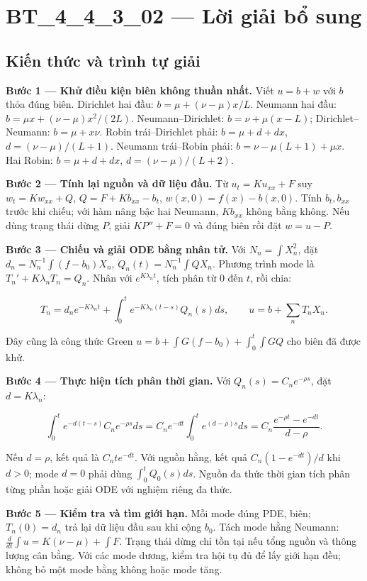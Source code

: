\documentclass[10pt,a4paper]{article}
\begin{document}
\section*{BT\_4\_4\_3\_02 — Lời giải bổ sung}
\subsection*{Kiến thức và trình tự giải}
\textbf{Bước 1 — Khử điều kiện biên không thuần nhất.} Viết $u=b+w$ với $b$ thỏa đúng biên. Dirichlet hai đầu: $b=\mu+(\nu-\mu)x/L$. Neumann hai đầu: $b=\mu x+(\nu-\mu)x^2/(2L)$. Neumann–Dirichlet: $b=\nu+\mu(x-L)$; Dirichlet–Neumann: $b=\mu+x\nu$. Robin trái–Dirichlet phải: $b=\mu+d+dx$, $d=(\nu-\mu)/(L+1)$. Neumann trái–Robin phải: $b=\nu-\mu(L+1)+\mu x$. Hai Robin: $b=\mu+d+dx$, $d=(\nu-\mu)/(L+2)$.

\textbf{Bước 2 — Tính lại nguồn và dữ liệu đầu.} Từ $u_t=Ku_{xx}+F$ suy $w_t=Kw_{xx}+Q$, $Q=F+Kb_{xx}-b_t$, $w(x,0)=f(x)-b(x,0)$. Tính $b_t,b_{xx}$ trước khi chiếu; với hàm nâng bậc hai Neumann, $Kb_{xx}$ không bằng không. Nếu dùng trạng thái dừng $P$, giải $KP''+F=0$ và đúng biên rồi đặt $w=u-P$.

\textbf{Bước 3 — Chiếu và giải ODE bằng nhân tử.} Với $N_n=\int X_n^2$, đặt $d_n=N_n^{-1}\int(f-b_0)X_n$, $Q_n(t)=N_n^{-1}\int QX_n$. Phương trình mode là $T_n'+K\lambda_nT_n=Q_n$. Nhân với $e^{K\lambda_nt}$, tích phân từ $0$ đến $t$, rồi chia:


\[
T_n=d_ne^{-K\lambda_nt}+\int_0^te^{-K\lambda_n(t-s)}Q_n(s)ds,\qquad
u=b+\sum_nT_nX_n.
\]


Đây cũng là công thức Green $u=b+\int G(f-b_0)+\int_0^t\int GQ$ cho biên đã được khử.

\textbf{Bước 4 — Thực hiện tích phân thời gian.} Với $Q_n(s)=C_ne^{-\rho s}$, đặt $d=K\lambda_n$:


\[
\int_0^te^{-d(t-s)}C_ne^{-\rho s}ds
=C_ne^{-dt}\int_0^te^{(d-\rho)s}ds
=C_n\frac{e^{-\rho t}-e^{-dt}}{d-\rho}.
\]


Nếu $d=\rho$, kết quả là $C_nte^{-dt}$. Với nguồn hằng, kết quả $C_n(1-e^{-dt})/d$ khi $d>0$; mode $d=0$ phải dùng $\int_0^tQ_0(s)ds$. Nguồn đa thức thời gian tích phân từng phần hoặc giải ODE với nghiệm riêng đa thức.

\textbf{Bước 5 — Kiểm tra và tìm giới hạn.} Mỗi mode đúng PDE, biên; $T_n(0)=d_n$ trả lại dữ liệu đầu sau khi cộng $b_0$. Tách mode hằng Neumann: $\frac d{dt}\int u=K(\nu-\mu)+\int F$. Trạng thái dừng chỉ tồn tại nếu tổng nguồn và thông lượng cân bằng. Với các mode dương, kiểm tra hội tụ đủ để lấy giới hạn đều; không bỏ một mode bằng không hoặc mode tăng.
\end{document}
